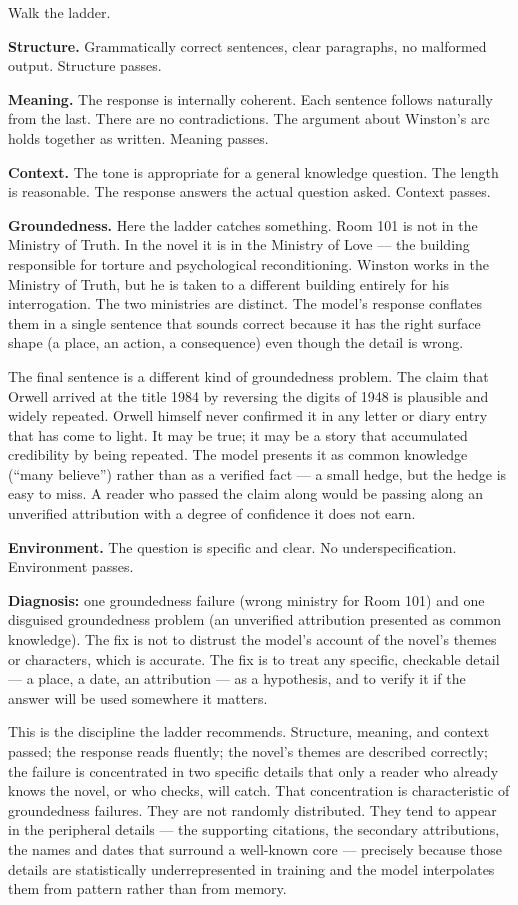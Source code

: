\medskip
\noindent Walk the ladder.

\medskip
\textbf{Structure.} Grammatically correct sentences, clear
paragraphs, no malformed output. Structure passes.

\textbf{Meaning.} The response is internally coherent. Each
sentence follows naturally from the last. There are no
contradictions. The argument about Winston's arc holds
together as written. Meaning passes.

\textbf{Context.} The tone is appropriate for a general
knowledge question. The length is reasonable. The response
answers the actual question asked. Context passes.

\textbf{Groundedness.} Here the ladder catches something.
Room 101 is not in the Ministry of Truth. In the novel it
is in the Ministry of Love --- the building responsible for
torture and psychological reconditioning. Winston works in
the Ministry of Truth, but he is taken to a different
building entirely for his interrogation. The two ministries
are distinct. The model's response conflates them in a
single sentence that sounds correct because it has the
right surface shape (a place, an action, a consequence)
even though the detail is wrong.

The final sentence is a different kind of groundedness problem.
The claim that Orwell arrived at the title 1984 by reversing
the digits of 1948 is plausible and widely repeated.
Orwell himself never confirmed it in any letter or diary
entry that has come to light. It may be true; it may be a
story that accumulated credibility by being repeated. The
model presents it as common knowledge (``many believe'')
rather than as a verified fact --- a small hedge, but the
hedge is easy to miss. A reader who passed the claim along
would be passing along an unverified attribution with a
degree of confidence it does not earn.

\textbf{Environment.} The question is specific and clear.
No underspecification. Environment passes.

\medskip
\noindent\textbf{Diagnosis:} one groundedness failure
(wrong ministry for Room 101) and one disguised groundedness
problem (an unverified attribution presented as common
knowledge). The fix is not to distrust the model's account of
the novel's themes or characters, which is accurate. The fix
is to treat any specific, checkable detail --- a place, a date,
an attribution --- as a hypothesis, and to verify it if the
answer will be used somewhere it matters.

\medskip
This is the discipline the ladder recommends. Structure,
meaning, and context passed; the response reads fluently; the
novel's themes are described correctly; the failure is
concentrated in two specific details that only a reader who
already knows the novel, or who checks, will catch. That
concentration is characteristic of groundedness failures. They
are not randomly distributed. They tend to appear in the
peripheral details --- the supporting citations, the secondary
attributions, the names and dates that surround a well-known
core --- precisely because those details are statistically
underrepresented in training and the model interpolates them
from pattern rather than from memory.


